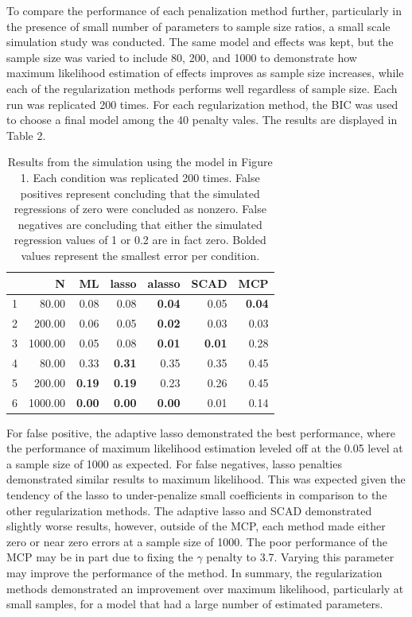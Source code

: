 \documentclass[article]{jss}
\begin{document}
To compare the performance of each penalization method further,
particularly in the presence of small number of parameters to sample
size ratios, a small scale simulation study was conducted. The same
model and effects was kept, but the sample size was varied to include
80, 200, and 1000 to demonstrate how maximum likelihood estimation of
effects improves as sample size increases, while each of the
regularization methods performs well regardless of sample size. Each run
was replicated 200 times. For each regularization method, the BIC was
used to choose a final model among the 40 penalty vales. The results are
displayed in Table 2.

\begin{table}[ht]
\centering
\begin{tabular}{rrrrrrr}
  \hline
 & N & ML & lasso & alasso & SCAD & MCP \\ 
  \hline
1 & 80.00 & 0.08 & 0.08 & \textbf{0.04} & 0.05 & \textbf{0.04} \\ 
  2 & 200.00 & 0.06 & 0.05 & \textbf{0.02} & 0.03 & 0.03 \\ 
  3 & 1000.00 & 0.05 & 0.08 & \textbf{0.01} & \textbf{0.01} & 0.28 \\ 
  4 & 80.00 & 0.33 & \textbf{0.31} & 0.35 & 0.35 & 0.45 \\ 
  5 & 200.00 & \textbf{0.19} & \textbf{0.19} & 0.23 & 0.26 & 0.45 \\ 
  6 & 1000.00 & \textbf{0.00} & \textbf{0.00} & \textbf{0.00} & 0.01 & 0.14 \\ 
   \hline
\end{tabular}
    \caption{Results from the simulation using the model in Figure 1. Each condition was replicated 200 times. False positives represent concluding that the simulated regressions of zero were concluded as nonzero. False negatives are concluding that either the simulated regression values of 1 or 0.2 are in fact zero. Bolded values represent the smallest error per condition.}
\end{table}

For false positive, the adaptive lasso demonstrated the best
performance, where the performance of maximum likelihood estimation
leveled off at the 0.05 level at a sample size of 1000 as expected. For
false negatives, lasso penalties demonstrated similar results to maximum
likelihood. This was expected given the tendency of the lasso to
under-penalize small coefficients in comparison to the other
regularization methods. The adaptive lasso and SCAD demonstrated
slightly worse results, however, outside of the MCP, each method made
either zero or near zero errors at a sample size of 1000. The poor
performance of the MCP may be in part due to fixing the \(\gamma\)
penalty to 3.7. Varying this parameter may improve the performance of
the method. In summary, the regularization methods demonstrated an
improvement over maximum likelihood, particularly at small samples, for
a model that had a large number of estimated parameters.
\end{document}
